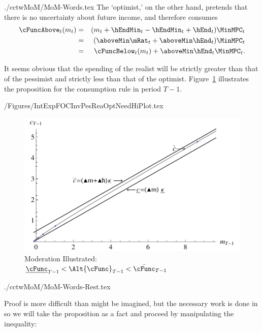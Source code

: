 \documentclass[titlepage]{\econtex}
\begin{document}
\begin{verbatimwrite}{./cctwMoM/MoM-Words.tex}
The `optimist,' on the other hand, pretends that there is no uncertainty
about future income, and therefore consumes
\begin{eqnarray*}
    \cFuncAbove_{t}(m_{t}) & = & ({m}_{t} +\hEndMin_{t} - \hEndMin_{t} + \hEnd_{t} )\MinMPC_{t}
\\   & = & (\aboveMin \mRat_{t} + \aboveMin \hEnd_{t})\MinMPC_{t}
\\     & = & \cFuncBelow_{t}(m_{t})+\aboveMin \hEnd_{t} \MinMPC_{t}
.
\end{eqnarray*}

It seems obvious that the spending of the realist will be strictly greater
than that of the pessimist and strictly less than that of the
optimist.  Figure~\ref{fig:IntExpFOCInvPesReaOptNeedHiPlot} illustrates the proposition for the consumption rule in period $T-1$.  
\end{verbatimwrite}

\begin{verbatimwrite}{\econtexRoot/Figures/IntExpFOCInvPesReaOptNeedHiPlot.tex}
\hypertarget{IntExpFOCInvPesReaOptNeedHiPlot}{}
\begin{figure}
        \includegraphics{./Figures/IntExpFOCInvPesReaOptNeedHiPlot}
        \caption{Moderation Illustrated: $\underline{\cFunc}_{T-1} < \Alt{\cFunc}_{T-1} < \bar{\cFunc}_{T-1}$}
        \label{fig:IntExpFOCInvPesReaOptNeedHiPlot}
\end{figure}
\end{verbatimwrite}

\begin{verbatimwrite}{./cctwMoM/MoM-Words-Rest.tex}

  \indent Proof is more difficult than might be imagined, but
the necessary work is done in \cite{BufferStockTheory} so we will take
the proposition as a fact and proceed by manipulating the inequality:
\end{verbatimwrite}
\end{document}
